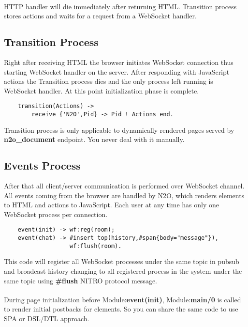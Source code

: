 \paragraph{}
HTTP handler will die immediately after returning HTML. Transition process
stores actions and waits for a request from a WebSocket handler.

\subsection{Transition Process}
Right after receiving HTML the browser initiates WebSocket connection
thus starting WebSocket handler on the server. After responding with
JavaScript actions the Transition process dies and the only process left
running is WebSocket handler. At this point initialization phase is complete.

\vspace{1\baselineskip}
\begin{lstlisting}
    transition(Actions) ->
        receive {'N2O',Pid} -> Pid ! Actions end.
\end{lstlisting}
\vspace{1\baselineskip}

Transition process is only applicable to dynamically rendered pages
served by {\bf n2o\_document} endpoint. You never deal with it manually.

\subsection{Events Process}
After that all client/server communication is performed over
WebSocket channel. All events coming from the browser are
handled by N2O, which renders elements to HTML and actions to
JavaScript. Each user at any time has only one WebSocket process
per connection.

\vspace{1\baselineskip}
\begin{lstlisting}
    event(init) -> wf:reg(room);
    event(chat) -> #insert_top(history,#span{body="message"}),
                   wf:flush(room).
\end{lstlisting}
\vspace{1\baselineskip}

This code will register all WebSocket processes under the same
topic in pubsub and broadcast history changing to all registered
process in the system under the same topic using {\bf \#flush}
NITRO protocol message.

\paragraph{}
During page initialization before Module:{\bf event(init)},
Module:{\bf main/0} is called to render initial postbacks for
elements. So you can share the same code to use SPA or DSL/DTL approach.


